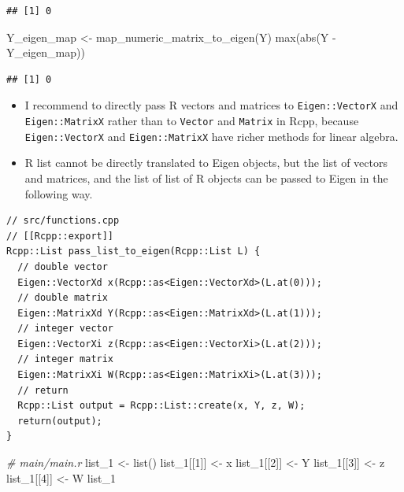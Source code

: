 \documentclass[
]{book}
\newenvironment{Shaded}{\begin{snugshade}}{\end{snugshade}}
\newcommand{\CommentTok}[1]{\textcolor[rgb]{0.56,0.35,0.01}{\textit{#1}}}
\newcommand{\DecValTok}[1]{\textcolor[rgb]{0.00,0.00,0.81}{#1}}
\newcommand{\FunctionTok}[1]{\textcolor[rgb]{0.00,0.00,0.00}{#1}}
\newcommand{\NormalTok}[1]{#1}
\newcommand{\OtherTok}[1]{\textcolor[rgb]{0.56,0.35,0.01}{#1}}
\newcommand{\SpecialCharTok}[1]{\textcolor[rgb]{0.00,0.00,0.00}{#1}}
\begin{document}
\begin{verbatim}
## [1] 0
\end{verbatim}

\begin{Shaded}
\begin{Highlighting}[]
\NormalTok{Y\_eigen\_map }\OtherTok{\textless{}{-}} \FunctionTok{map\_numeric\_matrix\_to\_eigen}\NormalTok{(Y)}
\FunctionTok{max}\NormalTok{(}\FunctionTok{abs}\NormalTok{(Y }\SpecialCharTok{{-}}\NormalTok{ Y\_eigen\_map))}
\end{Highlighting}
\end{Shaded}

\begin{verbatim}
## [1] 0
\end{verbatim}

\begin{itemize}
\item
  I recommend to directly pass R vectors and matrices to \texttt{Eigen::VectorX} and \texttt{Eigen::MatrixX} rather than to \texttt{Vector} and \texttt{Matrix} in Rcpp, because \texttt{Eigen::VectorX} and \texttt{Eigen::MatrixX} have richer methods for linear algebra.
\item
  R list cannot be directly translated to Eigen objects, but the list of vectors and matrices, and the list of list of R objects can be passed to Eigen in the following way.
\end{itemize}

\begin{verbatim}
// src/functions.cpp
// [[Rcpp::export]]
Rcpp::List pass_list_to_eigen(Rcpp::List L) {
  // double vector
  Eigen::VectorXd x(Rcpp::as<Eigen::VectorXd>(L.at(0)));
  // double matrix
  Eigen::MatrixXd Y(Rcpp::as<Eigen::MatrixXd>(L.at(1)));
  // integer vector
  Eigen::VectorXi z(Rcpp::as<Eigen::VectorXi>(L.at(2)));
  // integer matrix
  Eigen::MatrixXi W(Rcpp::as<Eigen::MatrixXi>(L.at(3)));
  // return
  Rcpp::List output = Rcpp::List::create(x, Y, z, W);
  return(output);
}
\end{verbatim}

\begin{Shaded}
\begin{Highlighting}[]
\CommentTok{\# main/main.r}
\NormalTok{list\_1 }\OtherTok{\textless{}{-}} \FunctionTok{list}\NormalTok{()}
\NormalTok{list\_1[[}\DecValTok{1}\NormalTok{]] }\OtherTok{\textless{}{-}}\NormalTok{ x}
\NormalTok{list\_1[[}\DecValTok{2}\NormalTok{]] }\OtherTok{\textless{}{-}}\NormalTok{ Y}
\NormalTok{list\_1[[}\DecValTok{3}\NormalTok{]] }\OtherTok{\textless{}{-}}\NormalTok{ z}
\NormalTok{list\_1[[}\DecValTok{4}\NormalTok{]] }\OtherTok{\textless{}{-}}\NormalTok{ W}
\NormalTok{list\_1}
\end{Highlighting}
\end{Shaded}
\end{document}
